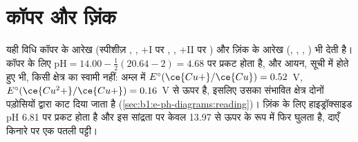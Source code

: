 \section{कॉपर और ज़िंक}

यही विधि कॉपर के आरेख (स्पीशीज़ , ,
$+$I पर , , $+$II पर ) और ज़िंक के आरेख (,
, , ) भी देती है। कॉपर के लिए 
$\mathrm{pH} = 14.00 - \frac12(20.64 - 2) = 4.68$ पर प्रकट होता है, और  आयन, सूची में होते हुए भी,
किसी क्षेत्र का स्वामी नहीं: अम्ल में $E^\circ(\ce{Cu+}/\ce{Cu}) = 0.52$~V,
$E^\circ(\ce{Cu^2+}/\ce{Cu+}) = 0.16$~V से ऊपर है, इसलिए उसका संभावित क्षेत्र
दोनों पड़ोसियों द्वारा काट दिया जाता है (\cref{sec:b1:e-ph-diagrams:reading})।
ज़िंक के लिए हाइड्रॉक्साइड pH 6.81 पर प्रकट होता है और इस सांद्रता पर
केवल 13.97 से ऊपर  के रूप में फिर घुलता है, दाएँ किनारे पर
एक पतली पट्टी।

